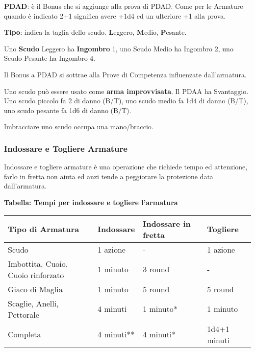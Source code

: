 \documentclass[12pt,a4paper,twoside,openany]{book}
\begin{document}
\begin{multicols}{2}

\medskip

\textbf{PDAD}: è il Bonus che si aggiunge alla prova di PDAD. Come per le Armature quando è indicato 2+1 significa avere +1d4 ed un ulteriore +1 alla prova.

\textbf{Tipo}: indica la taglia dello scudo. \textbf{L}eggero, \textbf{M}edio, \textbf{P}esante.

Uno \textbf{Scudo} Leggero ha \textbf{Ingombro} 1, uno Scudo Medio ha Ingombro 2, uno Scudo Pesante ha Ingombro 4.

Il Bonus a PDAD si sottrae alla Prove di Competenza influenzate dall'armatura.

Uno scudo può essere usato come \textbf{arma improvvisata}. Il PDAA ha Svantaggio. Uno scudo piccolo fa 2 di danno (B/T), uno scudo medio fa 1d4 di danno (B/T), uno scudo pesante fa 1d6 di danno (B/T).

Imbracciare uno scudo occupa una mano/braccio.

\subsubsection{Indossare e Togliere Armature}

Indossare e togliere armature è una operazione che richiede tempo ed attenzione, farlo in fretta non aiuta ed anzi tende a peggiorare la protezione data dall'armatura.

\end{multicols}

\textbf{Tabella: Tempi per indossare e togliere l'armatura}

\begin{tabular}{llll}
\textbf{Tipo di Armatura}& \textbf{Indossare} & \textbf{Indossare in fretta} & \textbf{Togliere}\\
\toprule
Scudo& 1 azione & - & 1 azione\\
Imbottita, Cuoio, Cuoio rinforzato  & 1 minuto& 3 round  & - \\
Giaco di Maglia& 1 minuto& 5 round  & 5 round\\
Scaglie, Anelli, Pettorale& 4 minuti & 1 minuto{*}  & 1 minuto\\
Completa  & 4 minuti{*}{*}& 4 minuti{*}& 1d4+1 minuti\\
\end{tabular}
\end{document}
